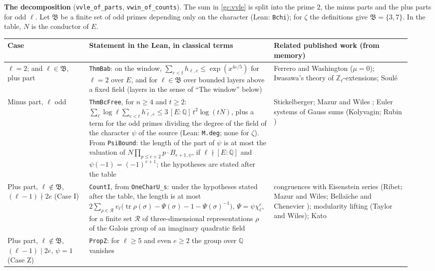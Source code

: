 \documentclass[11pt,letterpaper]{article}
\newcommand{\Z}{\mathbb Z}\newcommand{\Q}{\mathbb Q}\newcommand{\C}{\mathbb C}
\begin{document}
\textbf{The decomposition} (\texttt{vvle\_of\_parts}, \texttt{vwin\_of\_counts}). The sum in
\eqref{gc:vvle} is split into the prime $2$, the minus parts and the plus parts for odd $\ell$. Let
$\mathfrak B$ be a finite set of odd primes depending only on the character (Lean: \texttt{Bchi}); for
$\zeta$ the definitions give $\mathfrak B=\{3,7\}$. In the table, $N$ is the conductor of $E$.

\begin{center}\small
\begin{tabular}{@{}p{0.19\linewidth}p{0.43\linewidth}p{0.32\linewidth}@{}}
\toprule
Case & Statement in the Lean, in classical terms & \raggedright Related published work (from memory)\tabularnewline
\midrule
\raggedright $\ell=2$; and $\ell\in\mathfrak B$, plus part
& \raggedright \texttt{ThmBab}: on the window, $\sum_{e<t}h_{\ell,e}\le\exp(x^{4\varepsilon/5})$ for $\ell=2$ over $E$,
and for $\ell\in\mathfrak B$ over bounded layers above a fixed field (layers in the sense of ``The window'' below)
& \raggedright Ferrero and Washington \cite{FW79} ($\mu=0$); Iwasawa's theory of $\Z_\ell$-extensions; Soul\'e \cite{Sou03}\tabularnewline
\raggedright Minus part, $\ell$ odd
& \raggedright \texttt{ThmBcFree}, for $n\ge4$ and $t\ge2$: $\sum_\ell\log\ell\sum_{e<t}h^-_{\ell,e}\le3\,[E:\Q]\,t^2\log(tN)$,
plus a term for the odd primes dividing the degree of the field of the character $\psi$ of the source
(Lean: \texttt{M.deg}; none for $\zeta$). From \texttt{PsiBound}: the length of the part of $\psi$
is at most the valuation of $N\prod_{p\le e+2}p\cdot B_{e+1,\psi}$, if $\ell\nmid[E:\Q]$ and
$\psi(-1)=(-1)^{e+1}$; the hypotheses are stated after the table
& \raggedright Stickelberger; Mazur and Wiles \cite{MW84}; Euler systems of Gauss sums (Kolyvagin; Rubin \cite[\S2.2]{Rub00})\tabularnewline
\raggedright Plus part, $\ell\notin\mathfrak B$, $(\ell-1)\nmid2e$ (Case I)
& \raggedright \texttt{CountI}, from \texttt{OneCharU\_s}: under the hypotheses stated after the table, the length is at most
$2\sum_{\rho\in\mathcal R}v_\ell\big(\operatorname{tr}\rho(\sigma)-\Psi(\sigma)-1-\Psi(\sigma)^{-1}\big)$,
$\Psi=\psi\chi_\ell^{e}$, for a finite set $\mathcal R$ of three-dimensional representations $\rho$ of the
Galois group of an imaginary quadratic field
& \raggedright congruences with Eisenstein series (Ribet; Mazur and Wiles; Bella\"iche and Chenevier \cite{BC04});
modularity lifting (Taylor and Wiles); Kato \cite{Kat04}\tabularnewline
\raggedright Plus part, $\ell\notin\mathfrak B$, $(\ell-1)\mid2e$, $\psi=1$ (Case Z)
& \raggedright \texttt{PropZ}: for $\ell\ge5$ and even $e\ge2$ the group over $\Q$ vanishes

\end{tabular}
\end{center}
\end{document}

